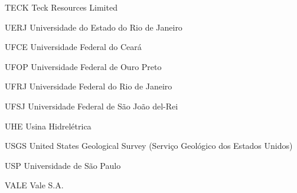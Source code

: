 \begin{siglas}
    \item[TECK] Teck Resources Limited
    \item[UERJ] Universidade do Estado do Rio de Janeiro
    \item[UFCE] Universidade Federal do Ceará
    \item[UFOP] Universidade Federal de Ouro Preto
    \item[UFRJ] Universidade Federal do Rio de Janeiro
    \item[UFSJ] Universidade Federal de São João del-Rei
    \item[UHE] Usina Hidrelétrica
    \item[USGS] United States Geological Survey (Serviço Geológico dos Estados Unidos)
    \item[USP] Universidade de São Paulo
    \item[VALE] Vale S.A.
\end{siglas}
